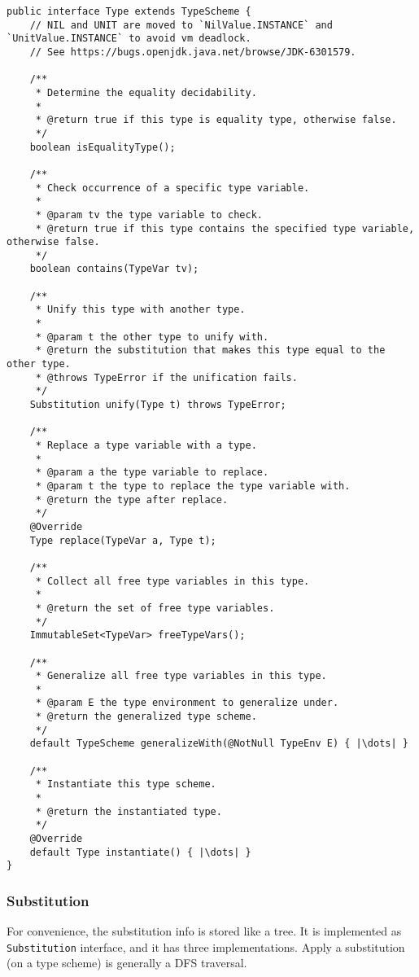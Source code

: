 \documentclass[a4paper]{article}
\begin{document}
\begin{verbatim}
public interface Type extends TypeScheme {
    // NIL and UNIT are moved to `NilValue.INSTANCE` and `UnitValue.INSTANCE` to avoid vm deadlock.
    // See https://bugs.openjdk.java.net/browse/JDK-6301579.

    /**
     * Determine the equality decidability.
     *
     * @return true if this type is equality type, otherwise false.
     */
    boolean isEqualityType();

    /**
     * Check occurrence of a specific type variable.
     *
     * @param tv the type variable to check.
     * @return true if this type contains the specified type variable, otherwise false.
     */
    boolean contains(TypeVar tv);

    /**
     * Unify this type with another type.
     *
     * @param t the other type to unify with.
     * @return the substitution that makes this type equal to the other type.
     * @throws TypeError if the unification fails.
     */
    Substitution unify(Type t) throws TypeError;

    /**
     * Replace a type variable with a type.
     *
     * @param a the type variable to replace.
     * @param t the type to replace the type variable with.
     * @return the type after replace.
     */
    @Override
    Type replace(TypeVar a, Type t);

    /**
     * Collect all free type variables in this type.
     *
     * @return the set of free type variables.
     */
    ImmutableSet<TypeVar> freeTypeVars();

    /**
     * Generalize all free type variables in this type.
     *
     * @param E the type environment to generalize under.
     * @return the generalized type scheme.
     */
    default TypeScheme generalizeWith(@NotNull TypeEnv E) { |\dots| }

    /**
     * Instantiate this type scheme.
     *
     * @return the instantiated type.
     */
    @Override
    default Type instantiate() { |\dots| }
}
\end{verbatim}

\subsubsection{Substitution}

For convenience, the substitution info is stored like a tree. It is implemented as \texttt{Substitution} interface, and it has three implementations.
Apply a substitution (on a type scheme) is generally a DFS traversal.
\end{document}
